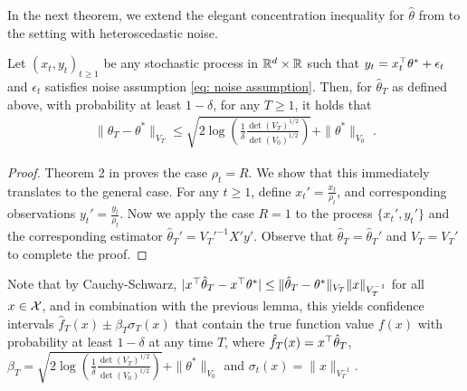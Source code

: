 In the next theorem, we extend the elegant concentration inequality for $\hat{\theta}$ from \cite{Abbasi-YadkoriImprovedAlgorithmsLinear2011} to the setting with heteroscedastic noise.
\begin{lemma}\label{lemma: concentration inequaliy for linear least squares}
	Let $(x_t, y_t)_{t\geq 1}$ be any stochastic process in $\mathbb{R}^d \times \mathbb{R}$ such that $y_t = x_t^\top \theta^* + \epsilon_t$ and $\epsilon_t$ satisfies noise assumption \eqref{eq: noise assumption}. Then, for $\hat{\theta}_T$ as defined above, with probability at least $1-\delta$, for any $T \geq 1$, it holds that
	\begin{align*}
	\|\hat{\theta}_T - \theta^* \|_{V_T} \leq \sqrt{2 \log\left(\frac{1}{\delta}\frac{\det(V_T)^{1/2}}{\det(V_0)^{1/2}}\right)} + \|\theta^*\|_{V_0} \text{ .}
	\end{align*}
\end{lemma}
\begin{proof}
	Theorem 2 in \citep{Abbasi-YadkoriImprovedAlgorithmsLinear2011}  proves the case $\rho_t=R$. We show that this immediately translates to the general case. For any $t \geq 1$, define $x_t' = \frac{x_t}{\rho_t}$, and corresponding observations $y_t' = \frac{y_t}{\rho_t}$. Now we apply the case $R=1$ to the process $\{x_t', y_t'\}$ and the corresponding estimator $\hat{\theta}_T' = V_T'^{-1}X'y'$. Observe that $\hat{\theta}_T = \hat{\theta}_T'$ and $V_T = V_T'$ to complete the proof.
\end{proof}
Note that by Cauchy-Schwarz, $|x^\top \hat{\theta}_T - x^\top \theta^*| \leq \|\hat{\theta}_T - \theta^*\|_{V_T}\|x\|_{V_T^{-1}}$ for all $x\in \mathcal{X}$, and in combination with the previous lemma, this yields confidence intervals $\hat{f}_T(x) \pm\beta_T\sigma_T(x)$ that contain the true function value $f(x)$ with probability at least $1-\delta$ at any time $T$, where $\hat{f}_T(x) = x^\top\hat{\theta}_T$, $\beta_T = \sqrt{2 \log\left(\frac{1}{\delta}\frac{\det(V_T)^{1/2}}{\det(V_0)^{1/2}}\right)} + \|\theta^*\|_{V_0} $ and $\sigma_t(x) = \|x\|_{V_T^{-1}}$.
